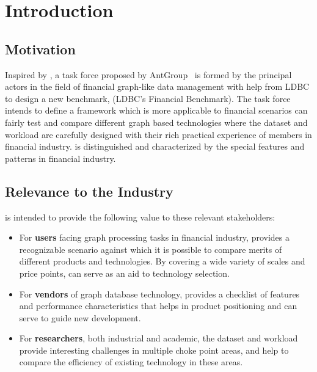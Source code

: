 \chapter{Introduction}
\label{sec:introduction}


\section{Motivation}

Inspired by \ldbcsnb, a task force proposed by AntGroup~\cite{antgroup} is
formed by the principal actors in the field of financial graph-like data
management with help from LDBC to design a new benchmark, \ldbcfinbench(LDBC's
Financial Benchmark). The task force intends to define a framework which is more
applicable to financial scenarios can fairly test and compare different graph
based technologies where the dataset and workload are carefully designed with
their rich practical experience of members in financial industry. \ldbcfinbench
is distinguished and characterized by the special features and patterns in
financial industry.


\section{Relevance to the Industry}

\ldbcfinbench is intended to provide the following value to these relevant
stakeholders:

\begin{itemize}
    \item For \textbf{users} facing graph processing tasks in financial industry,
          \ldbcfinbench provides a recognizable scenario against which it is possible
          to compare merits of different products and technologies. By covering a wide
          variety of scales and price points, \ldbcfinbench can serve as an aid to
          technology selection.
    \item For \textbf{vendors} of graph database technology, \ldbcfinbench provides a
          checklist of features and performance characteristics that helps in product
          positioning and can serve to guide new development.
    \item For \textbf{researchers}, both industrial and academic, the \ldbcfinbench
          dataset and workload provide interesting challenges in multiple choke point
          areas, and help to compare the efficiency of existing technology in these
          areas.
\end{itemize}


